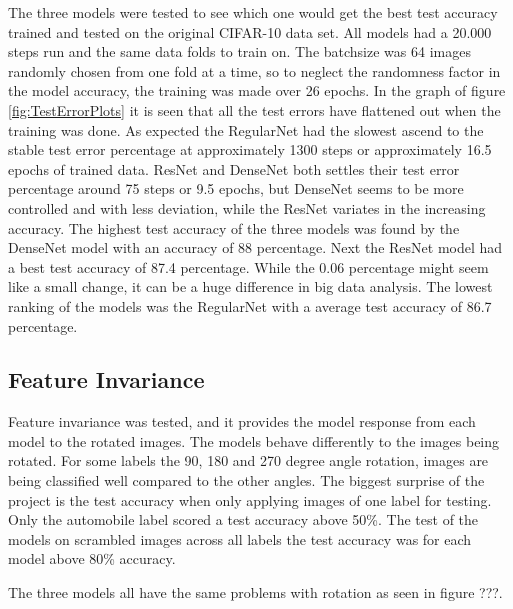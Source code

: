 The three models were tested to see which one would get the best test accuracy trained and tested on the original CIFAR-10 data set. All models had a 20.000 steps run and the same data folds to train on. The batchsize was 64 images randomly chosen from one fold at a time, so to neglect the randomness factor in the model accuracy, the training was made over 26 epochs. In the graph of figure \ref{fig:TestErrorPlots} it is seen that all the test errors have flattened out when the training was done. As expected the RegularNet had the slowest ascend to the stable test error percentage at approximately 1300 steps or approximately 16.5 epochs of trained data. ResNet and DenseNet both settles their test error percentage around 75 steps or 9.5 epochs, but DenseNet seems to be more controlled and with less deviation, while the ResNet variates in the increasing accuracy. The highest test accuracy of the three models was found by the DenseNet model with an accuracy of 88 percentage. Next the ResNet model had a best test accuracy of 87.4 percentage. While the 0.06 percentage might seem like a small change, it can be a huge difference in big data analysis. The lowest ranking of the models was the RegularNet with a average test accuracy of 86.7 percentage.

\subsection{Feature Invariance}

Feature invariance was tested, and it provides the model response from each model to the rotated images. The models behave differently to the images being rotated. For some labels the 90, 180 and 270 degree angle rotation, images are being classified well compared to the other angles. The biggest surprise of the project is the test accuracy when only applying images of one label for testing. Only the automobile label scored a test accuracy above 50\%. The test of the models on scrambled images across all labels the test accuracy was for each model above 80\% accuracy.

The three models all have the same problems with rotation as seen in figure ???.

\FloatBarrier

